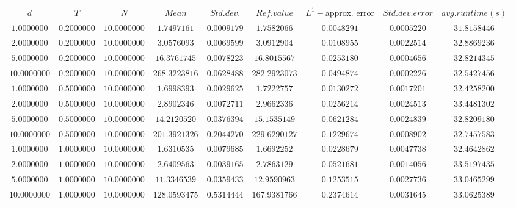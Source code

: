 \begin{tabular}{ccccccccc}
$d$ & $T$ & $N$ & $Mean$ & $Std. dev.$ & $Ref. value$ & $L^1-$approx. error & $Std. dev. error$ & $avg. runtime (s)$\\
$1.0000000$ & $0.2000000$ & $10.0000000$ & $1.7497161$ & $0.0009179$ & $1.7582066$ & $0.0048291$ & $0.0005220$ & $31.8158446$\\
$2.0000000$ & $0.2000000$ & $10.0000000$ & $3.0576093$ & $0.0069599$ & $3.0912904$ & $0.0108955$ & $0.0022514$ & $32.8869236$\\
$5.0000000$ & $0.2000000$ & $10.0000000$ & $16.3761745$ & $0.0078223$ & $16.8015567$ & $0.0253180$ & $0.0004656$ & $32.8214345$\\
$10.0000000$ & $0.2000000$ & $10.0000000$ & $268.3223816$ & $0.0628488$ & $282.2923073$ & $0.0494874$ & $0.0002226$ & $32.5427456$\\
$1.0000000$ & $0.5000000$ & $10.0000000$ & $1.6998393$ & $0.0029625$ & $1.7222757$ & $0.0130272$ & $0.0017201$ & $32.4258200$\\
$2.0000000$ & $0.5000000$ & $10.0000000$ & $2.8902346$ & $0.0072711$ & $2.9662336$ & $0.0256214$ & $0.0024513$ & $33.4481302$\\
$5.0000000$ & $0.5000000$ & $10.0000000$ & $14.2120520$ & $0.0376394$ & $15.1535149$ & $0.0621284$ & $0.0024839$ & $32.8209180$\\
$10.0000000$ & $0.5000000$ & $10.0000000$ & $201.3921326$ & $0.2044270$ & $229.6290127$ & $0.1229674$ & $0.0008902$ & $32.7457583$\\
$1.0000000$ & $1.0000000$ & $10.0000000$ & $1.6310535$ & $0.0079685$ & $1.6692252$ & $0.0228679$ & $0.0047738$ & $32.4642862$\\
$2.0000000$ & $1.0000000$ & $10.0000000$ & $2.6409563$ & $0.0039165$ & $2.7863129$ & $0.0521681$ & $0.0014056$ & $33.5197435$\\
$5.0000000$ & $1.0000000$ & $10.0000000$ & $11.3346539$ & $0.0359433$ & $12.9590963$ & $0.1253515$ & $0.0027736$ & $33.0465299$\\
$10.0000000$ & $1.0000000$ & $10.0000000$ & $128.0593475$ & $0.5314444$ & $167.9381766$ & $0.2374614$ & $0.0031645$ & $33.0625389$\\
\end{tabular}
